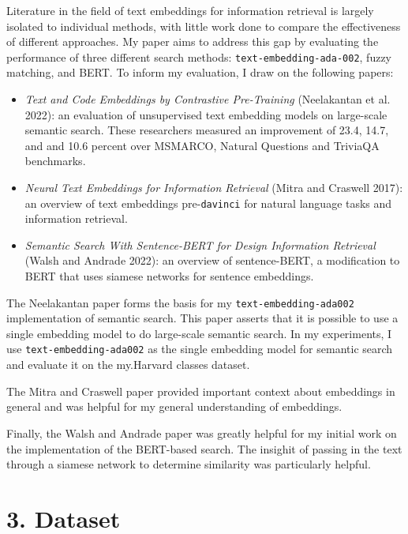 \documentclass[
	a4paper, %
	10pt, %
	unnumberedsections, %
	twoside, %
]{LTJournalArticle}
\begin{document}
Literature in the field of text embeddings for information retrieval is largely isolated to individual methods, with little work done to compare the effectiveness of different approaches. My paper aims to address this gap by evaluating the performance of three different search methods: \texttt{text-embedding-ada-002}, fuzzy matching, and BERT. To inform my evaluation, I draw on the following papers:


\begin{itemize}
	\item \textit{Text and Code Embeddings by Contrastive Pre-Training} (Neelakantan et al. 2022): an evaluation of unsupervised text embedding models on large-scale semantic search. These researchers measured an improvement of 23.4, 14.7, and and 10.6 percent over MSMARCO, Natural Questions and TriviaQA benchmarks. 
	\item \textit{Neural Text Embeddings for Information Retrieval} (Mitra and Craswell 2017): an overview of text embeddings pre-\texttt{davinci} for natural language tasks and information retrieval. 
	\item \textit{Semantic Search With Sentence-BERT for Design Information Retrieval} (Walsh and Andrade 2022): an overview of sentence-BERT, a modification to BERT that uses siamese networks for sentence embeddings. 
\end{itemize}

The Neelakantan paper forms the basis for my \texttt{text-embedding-ada002} implementation of semantic search. This paper asserts that it is possible to use a single embedding model to do large-scale semantic search. In my experiments, I use \texttt{text-embedding-ada002}  as the single embedding model for semantic search and evaluate it on the my.Harvard classes dataset. 

The Mitra and Craswell paper provided important context about embeddings in general and was helpful for my general understanding of embeddings.

Finally, the Walsh and Andrade paper was greatly helpful for my initial work on the implementation of the BERT-based search. The insighit of passing in the text through a siamese network to determine similarity was particularly helpful. 

\section{3. Dataset}
\end{document}
